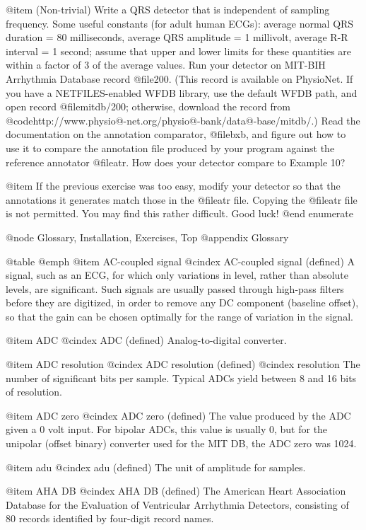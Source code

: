 {{{{{{{{{@item
(Non-trivial) Write a QRS detector that is independent of sampling frequency.
Some useful constants (for adult human ECGs): average normal QRS duration = 80
milliseconds, average QRS amplitude = 1 millivolt, average R-R interval = 1
second; assume that upper and lower limits for these quantities are within a
factor of 3 of the average values.  Run your detector on MIT-BIH Arrhythmia
Database record @file{200}.  (This record is available on PhysioNet.  If you
have a NETFILES-enabled WFDB library, use the default WFDB path, and open
record @file{mitdb/200}; otherwise, download the record from
@code{http://www.physio@-net.org/physio@-bank/data@-base/mitdb/}.)  Read the
documentation on the annotation comparator, @file{bxb}, and figure out how to
use it to compare the annotation file produced by your program against the
reference annotator @file{atr}.  How does your detector compare to Example
10?

@item
If the previous exercise was too easy, modify your detector so that the
annotations it generates match those in the @file{atr} file.  Copying
the @file{atr} file is not permitted.  You may find this rather
difficult.  Good luck!
@end enumerate

@node     Glossary, Installation, Exercises, Top
@appendix Glossary

@table @emph
@item AC-coupled signal
@cindex AC-coupled signal (defined)
A signal, such as an ECG, for which only variations in level, rather
than absolute levels, are significant.  Such signals are usually passed
through high-pass filters before they are digitized, in order to remove
any DC component (baseline offset), so that the gain can be chosen
optimally for the range of variation in the signal.

@item ADC
@cindex ADC (defined)
Analog-to-digital converter.

@item ADC resolution
@cindex ADC resolution (defined)
@cindex resolution
The number of significant bits per sample.  Typical ADCs yield between 8
and 16 bits of resolution.

@item ADC zero
@cindex ADC zero (defined)
The value produced by the ADC given a 0 volt input.  For bipolar ADCs,
this value is usually 0, but for the unipolar (offset binary) converter
used for the MIT DB, the ADC zero was 1024.

@item adu
@cindex adu (defined)
The unit of amplitude for samples.

@item AHA DB
@cindex AHA DB (defined)
The American Heart Association Database for the Evaluation of Ventricular
Arrhythmia Detectors, consisting of 80 records identified by four-digit
record names.

}}}}}}}}}
